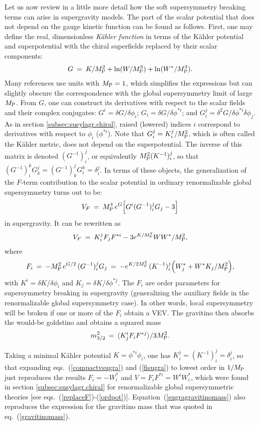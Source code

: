 \documentclass[11pt]{article}
\def\beq{\begin{eqnarray}}
\def\eeq{\end{eqnarray}}
\def\MPlanck{M_{\rm P}}
\begin{document}
Let us now review in a little more detail how the soft supersymmetry 
breaking terms can arise in supergravity models. The part of the scalar 
potential that does not depend on the gauge kinetic function can be found 
as follows. First, one may define the real, dimensionless {\em K\"ahler 
function} in terms of the K\"ahler potential and superpotential with the 
chiral superfields replaced by their scalar components:
\beq
G \>=\> 
{K/\MPlanck^2} + {\rm ln}({W/\MPlanck^3}) +{\rm ln}{(W^*/\MPlanck^3)}.
\label{eq:defKahlerfun}
\eeq
Many references use units with $\MPlanck=1$,
which simplifies the expressions but can slightly obscure the
correspondence with the global supersymmetry limit of large $\MPlanck$.
From $G$, one can construct its derivatives with respect to the scalar
fields and their complex conjugates: $G^i = {\delta G/\delta \phi_i}$; 
$G_i = {\delta G/\delta \phi^{* i}}$; and $G_i^j = {\delta^2
G/\delta\phi^{* i}\delta\phi_j}$. As in section 
\ref{subsec:susylagr.chiral}, raised (lowered) indices $i$
correspond to derivatives with respect to $\phi_i$ ($\phi^{*i}$). 
Note that $G_i^j =
K_i^j/\MPlanck^2$, which is often called the K\"ahler metric, does not
depend on the superpotential.  The inverse of this matrix is denoted
$(G^{-1})_i^j$, or equivalently $\MPlanck^2 (K^{-1})_i^j$, so that
$(G^{-1})^k_i G_k^j = (G^{-1})^j_k G_i^k = \delta_i^j$. In terms of these
objects, the generalization of the $F$-term contribution to the
scalar potential in ordinary renormalizable global supersymmetry turns out
\cite{supergravity,superconformalsupergravity} to be: 
\beq
V_F \>=\> \MPlanck^4 \, e^G \Bigl [ G^i (G^{-1})_i^j G_j -3 \Bigr ]
\label{vsugra}
\eeq
in supergravity. It can be rewritten as
\beq
V_F \>=\> K_i^j F_j F^{*i} - 3 e^{K/\MPlanck^2} WW^*/\MPlanck^2 ,
\label{compactvsugra}
\eeq
where
\beq
F_i \>=\> -\MPlanck^2\, e^{G/2} \, (G^{-1})_i^j G_j 
    \>=\> -e^{K/2 \MPlanck^2}\, (K^{-1})_i^j
\Bigl ( W^*_j + W^* K_j/\MPlanck^2 \Bigr ),
\label{fisugra}
\eeq
with $K^i = \delta K/\delta \phi_i$ and $K_j = \delta K/\delta \phi^{*j}$.
The $F_i$ are order parameters for supersymmetry breaking in supergravity
(generalizing the auxiliary fields in the renormalizable global
supersymmetry case). In other words, local supersymmetry will be broken if
one or more of the $F_i$ obtain a VEV. The gravitino then absorbs the
would-be goldstino and obtains a squared mass
\beq
m^2_{3/2} \,=\, \langle K_j^i F_i F^{*j}\rangle/3\MPlanck^2.
\label{sugragravitinomass}
\eeq

Taking a minimal K\"ahler potential $ K = \phi^{*i} \phi_i $, 
one has $K_i^j=(K^{-1})_i^j = \delta_i^j$, so that expanding 
eqs.~(\ref{compactvsugra}) and (\ref{fisugra}) to lowest order in 
$1/\MPlanck$ just reproduces the results $F_i = -W^*_i$ and $V = F_i 
F^{*i} = W^i W_i^*$, which were found in section 
\ref{subsec:susylagr.chiral} for renormalizable global supersymmetric 
theories [see eqs.~(\ref{replaceF})-(\ref{ordpot})]. 
Equation~(\ref{sugragravitinomass}) also reproduces the expression for the 
gravitino mass that was quoted in eq.~(\ref{gravitinomass}).
\end{document}
